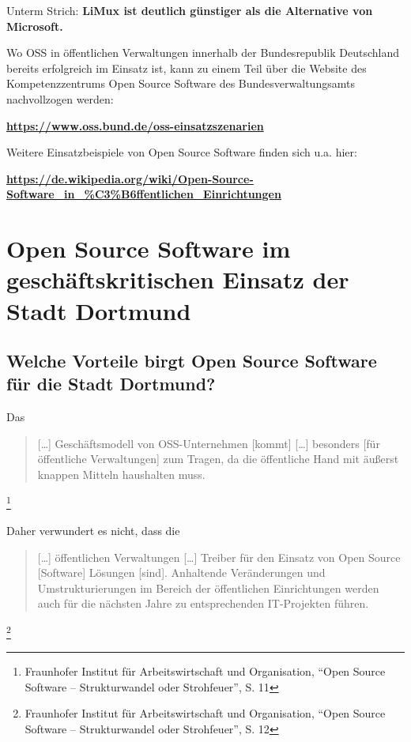 \documentclass[a4paper]{scrartcl}
\begin{document}
Unterm Strich: \textbf{LiMux ist deutlich günstiger als die Alternative von
  Microsoft.}

Wo OSS in öffentlichen Verwaltungen innerhalb der Bundesrepublik Deutschland
bereits erfolgreich im Einsatz ist, kann zu einem Teil über die Website des
Kompetenzzentrums Open Source Software des Bundesverwaltungsamts nachvollzogen
werden:

{\centering
\href{https://www.oss.bund.de/oss-einsatzszenarien}{{\textbf{http}}}\href{https://www.oss.bund.de/oss-einsatzszenarien}{{\textbf{s://www.oss.bund.de/oss-einsatzszenarien}}}
}

{\centering
[abgerufen am 13.03.2012]
}

Weitere Einsatzbeispiele von Open Source Software finden sich u.a.  hier:

{\centering
\href{https://de.wikipedia.org/wiki/Open-Source-Software_in_?ffentlichen_Einrichtungen}{{\textbf{https://de.wikipedia.org/wiki/Open-Source-Software\_in\_\%C3\%B6ffentlichen\_Einrichtungen}}}
}

{\centering
[abgerufen am 13.03.2012]
}

\section{Open Source Software im geschäftskritischen Einsatz der Stadt Dortmund}

\subsection{Welche Vorteile birgt Open Source Software für die Stadt Dortmund?}

Das \begin{quote} [\ldots] Geschäftsmodell von OSS-Unternehmen [kommt] [\ldots]
  besonders [für öffentliche Verwaltungen] zum Tragen, da die öffentliche Hand
  mit äußerst knappen Mitteln haushalten muss.
\end{quote}\footnote{Fraunhofer Institut für Arbeitswirtschaft und Organisation,
  ``Open Source Software -- Strukturwandel oder Strohfeuer'', S. 11}

Daher verwundert es nicht, dass die \begin{quote} [\ldots] öffentlichen
  Verwaltungen [\ldots] Treiber für den Einsatz von Open Source [Software]
  Lösungen [sind]. Anhaltende Veränderungen und Umstrukturierungen im Bereich
  der öffentlichen Einrichtungen werden auch für die nächsten Jahre zu
  entsprechenden IT-Projekten führen.
\end{quote}\footnote{Fraunhofer Institut für Arbeitswirtschaft und Organisation,
  ``Open Source Software -- Strukturwandel oder Strohfeuer'', S. 12}
\end{document}
